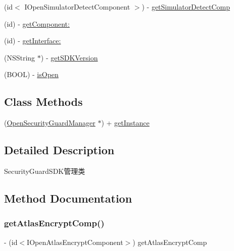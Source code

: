 \begin{DoxyCompactItemize}
\item 
(id$<$ I\+Open\+Simulator\+Detect\+Component $>$) -\/ \mbox{\hyperlink{interface_open_security_guard_manager_a2a38d633173559b468e03fc156a98457}{get\+Simulator\+Detect\+Comp}}
\item 
(id) -\/ \mbox{\hyperlink{interface_open_security_guard_manager_aab2df8eb76a8764540a05a04c2869755}{get\+Component\+:}}
\item 
(id) -\/ \mbox{\hyperlink{interface_open_security_guard_manager_adf4c50e3c51091d3f4fdfbd5e45ebc38}{get\+Interface\+:}}
\item 
(N\+S\+String $\ast$) -\/ \mbox{\hyperlink{interface_open_security_guard_manager_adafed1f05a60542ed8026d060f732f39}{get\+S\+D\+K\+Version}}
\item 
(B\+O\+OL) -\/ \mbox{\hyperlink{interface_open_security_guard_manager_a705c64d9df8f02624a2924b03adf5936}{is\+Open}}
\end{DoxyCompactItemize}
\subsection*{Class Methods}
\begin{DoxyCompactItemize}
\item 
(\mbox{\hyperlink{interface_open_security_guard_manager}{Open\+Security\+Guard\+Manager}} $\ast$) + \mbox{\hyperlink{interface_open_security_guard_manager_a107e1e5efdab22666b81072a01861a0b}{get\+Instance}}
\end{DoxyCompactItemize}


\subsection{Detailed Description}
Security\+Guard\+S\+D\+K管理类 

\subsection{Method Documentation}
\mbox{\label{interface_open_security_guard_manager_ad62d9e47e2d2185c0b8f619671b841a0}} 
\subsubsection{\texorpdfstring{get\+Atlas\+Encrypt\+Comp()}{getAtlasEncryptComp()}}
{\footnotesize\ttfamily -\/ (id$<$I\+Open\+Atlas\+Encrypt\+Component$>$) get\+Atlas\+Encrypt\+Comp \begin{DoxyParamCaption}{ }\end{DoxyParamCaption}}

